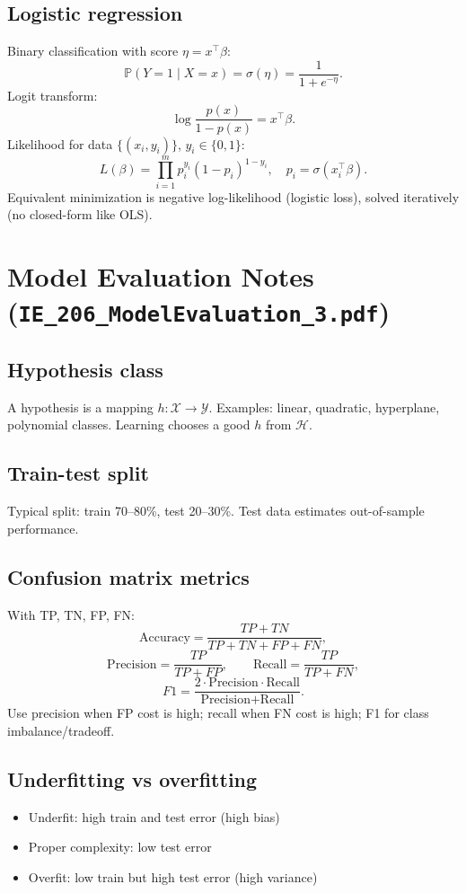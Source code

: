 \documentclass[11pt]{article}
\newcommand{\PP}{\mathbb{P}}
\newcommand{\1}{\mathbf{1}}
\begin{document}
\subsection*{Logistic regression}
Binary classification with score $\eta=x^\top\beta$:
\[
\PP(Y=1\mid X=x)=\sigma(\eta)=\frac{1}{1+e^{-\eta}}.
\]
Logit transform:
\[
\log\frac{p(x)}{1-p(x)}=x^\top\beta.
\]
Likelihood for data $\{(x_i,y_i)\}$, $y_i\in\{0,1\}$:
\[
L(\beta)=\prod_{i=1}^m p_i^{y_i}(1-p_i)^{1-y_i},
\quad p_i=\sigma(x_i^\top\beta).
\]
Equivalent minimization is negative log-likelihood (logistic loss), solved iteratively (no closed-form like OLS).

\section{Model Evaluation Notes (\texttt{IE\_206\_ModelEvaluation\_3.pdf})}
\subsection*{Hypothesis class}
A hypothesis is a mapping $h:\mathcal X\to\mathcal Y$.
Examples: linear, quadratic, hyperplane, polynomial classes. Learning chooses a good $h$ from $\mathcal H$.

\subsection*{Train-test split}
Typical split: train 70--80\%, test 20--30\%. Test data estimates out-of-sample performance.

\subsection*{Confusion matrix metrics}
With TP, TN, FP, FN:
\[
\text{Accuracy}=\frac{TP+TN}{TP+TN+FP+FN},
\]
\[
\text{Precision}=\frac{TP}{TP+FP},
\qquad
\text{Recall}=\frac{TP}{TP+FN},
\]
\[
F1=\frac{2\cdot\text{Precision}\cdot\text{Recall}}{\text{Precision}+\text{Recall}}.
\]
Use precision when FP cost is high; recall when FN cost is high; F1 for class imbalance/tradeoff.

\subsection*{Underfitting vs overfitting}
\begin{itemize}
\item Underfit: high train and test error (high bias)
\item Proper complexity: low test error
\item Overfit: low train but high test error (high variance)
\end{itemize}
\end{document}
